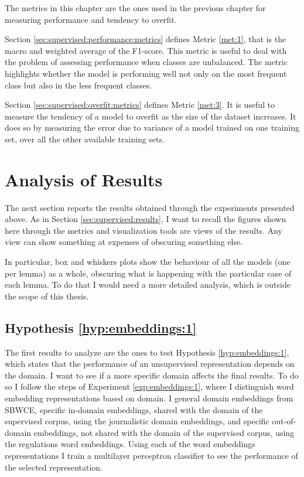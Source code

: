 The metrics in this chapter are the ones used in the previous chapter for
measuring performance and tendency to overfit.

Section \ref{sec:supervised:performance:metrics} defines Metric \ref{met:1},
that is the macro and weighted average of the F1-score. This metric is useful
to deal with the problem of assessing performance when classes are unbalanced.
The metric highlights whether the model is performing well not only on the most
frequent class but also in the less frequent classes.

Section \ref{sec:supervised:overfit:metrics} defines Metric \ref{met:3}. It is
useful to measure the tendency of a model to overfit as the size of the dataset
increases. It does so by measuring the error due to variance of a model trained
on one training set, over all the other available training sets.

\section{Analysis of Results}\label{sec:embeddings:results}

The next section reports the results obtained through the experiments
presented above. As in Section \ref{sec:supervised:results}, I want to recall
the figures shown here through the metrics and visualization tools are views of
the results. Any view can show something at expenses of obscuring
something else.

In particular, box and whiskers plots show the behaviour of all the models (one
per lemma) as a whole, obscuring what is happening with the particular case of
each lemma. To do that I would need a more detailed analysis, which is outside
the scope of this thesis.

\subsection{Hypothesis \ref{hyp:embeddings:1}}\label{sec:embeddings:hyp:1}

The first results to analyze are the ones to test Hypothesis
\ref{hyp:embeddings:1}, which states that the performance of an
unsupervised representation depends on the domain. I want to see if a more
specific domain affects the final results. To do so I follow the steps of
Experiment \ref{exp:embeddings:1}, where I distinguish word embedding
representations based on domain. I general domain embeddings from SBWCE,
specific in-domain embeddings, shared with the domain of the supervised corpus,
using the journalistic domain embeddings, and specific out-of-domain
embeddings, not shared with the domain of the supervised corpus, using the
regulations word embeddings. Using each of the word embeddings representations
I train a multilayer perceptron classifier to see the performance of the
selected representation.

